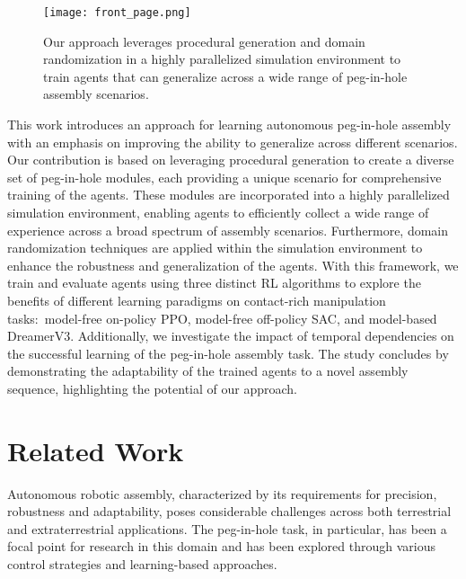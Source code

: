 \begin{figure}[t]
    \vspace{2.057mm}
    \centering
    \texttt{[image: front\_page.png]}
    \caption{Our approach leverages procedural generation and domain randomization in a highly parallelized simulation environment to train agents that can generalize across a wide range of peg-in-hole assembly scenarios.}
    \label{fig:front-page}
    \vspace{-1.0\baselineskip}
\end{figure}

This work introduces an approach for learning autonomous peg-in-hole assembly with an emphasis on improving the ability to generalize across different scenarios. Our contribution is based on leveraging procedural generation to create a diverse set of peg-in-hole modules, each providing a unique scenario for comprehensive training of the agents. These modules are incorporated into a highly parallelized simulation environment, enabling agents to efficiently collect a wide range of experience across a broad spectrum of assembly scenarios. Furthermore, domain randomization techniques are applied within the simulation environment to enhance the robustness and generalization of the agents. With this framework, we train and evaluate agents using three distinct RL algorithms to explore the benefits of different learning paradigms on contact-rich manipulation tasks:~model-free on-policy PPO, model-free off-policy SAC, and model-based DreamerV3. Additionally, we investigate the impact of temporal dependencies on the successful learning of the peg-in-hole assembly task. The study concludes by demonstrating the adaptability of the trained agents to a novel assembly sequence, highlighting the potential of our approach.


\section{Related Work}\label{sec:related-work}

Autonomous robotic assembly, characterized by its requirements for precision, robustness and adaptability, poses considerable challenges across both terrestrial and extraterrestrial applications. The peg-in-hole task, in particular, has been a focal point for research in this domain and has been explored through various control strategies and learning-based approaches.

